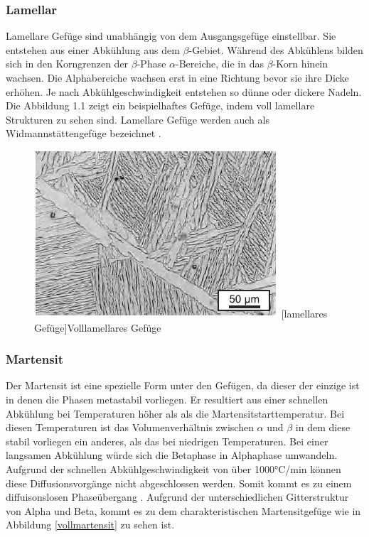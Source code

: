 \documentclass[a4paper, 11pt]{tubsreprt}
\begin{document}
\subsubsection{Lamellar}
Lamellare Gefüge sind unabhängig von dem Ausgangsgefüge einstellbar. Sie entstehen aus einer Abkühlung aus dem $\beta$-Gebiet. Während des Abkühlens bilden sich in den Korngrenzen der $\beta$-Phase $\alpha$-Bereiche, die in das $\beta$-Korn hinein wachsen. Die Alphabereiche wachsen erst in eine Richtung bevor sie ihre Dicke erhöhen. Je nach Abkühlgeschwindigkeit entstehen so dünne oder dickere Nadeln. Die Abbildung 1.1 zeigt ein beispielhaftes Gefüge, indem voll lamellare Strukturen zu sehen sind. Lamellare Gefüge werden auch als Widmannstättengefüge bezeichnet \cite{Luetjering2007}.


\begin{figure}


	\centering
		\includegraphics[scale=1]{Bilder/lamellar.jpg}
		[lamellares Gefüge]{Volllamellares Gefüge \cite{Leyens2002}}
		\label{lamellar}
		
\end{figure}
\subsubsection{Martensit}
Der Martensit ist eine spezielle Form unter den Gefügen, da dieser der einzige ist in denen die Phasen metastabil vorliegen. Er resultiert aus einer schnellen Abkühlung bei Temperaturen höher als als die Martensitstarttemperatur. Bei diesen Temperaturen ist das Volumenverhältnis zwischen $\alpha$ und $\beta$ in dem diese stabil vorliegen ein anderes, als das bei niedrigen Temperaturen. Bei einer langsamen Abkühlung würde sich die Betaphase in Alphaphase umwandeln. Aufgrund der schnellen Abkühlgeschwindigkeit von über 1000°C/min können diese Diffusionsvorgänge nicht abgeschlossen werden. Somit kommt es zu einem diffuisonslosen Phaseübergang \cite{Luetjering2007}. Aufgrund der unterschiedlichen Gitterstruktur von Alpha und Beta, kommt es zu dem charakteristischen Martensitgefüge wie in Abbildung \ref{vollmartensit} zu sehen ist.
\end{document}
